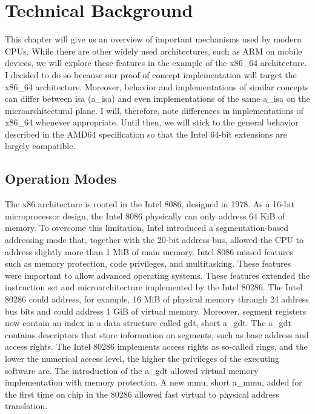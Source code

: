 \section{Technical Background}
\label{sec:state:technical}
This chapter will give us an overview of important mechanisms used by modern
CPUs. While there are other widely used architectures, such as ARM on mobile
devices, we will explore these features in the example of the x86\_64
architecture. \\

I decided to do so because our proof of concept implementation will target the
x86\_64 architecture. Moreover, behavior and implementations of similar concepts
can differ between \gls{isa} (\acrshort{a_isa}) and even implementations of the
same \acrshort{a_isa} on the microarchitectural plane. I will, therefore, note
differences in implementations of x86\_64 whenever appropriate. Until then, we
will stick to the general behavior described in the AMD64 specification so that
the Intel 64-bit extensions are largely compatible.

\subsection{Operation Modes}
\label{sec:state:technical:modes}
The x86 architecture is rooted in the Intel 8086, designed in 1978. As a 16-bit
microprocessor design, the Intel 8086 physically can only address 64 KiB of
memory. To overcome this limitation, Intel introduced a segmentation-based
addressing mode that, together with the 20-bit address bus, allowed the CPU to
address slightly more than 1 MiB of main memory. Intel 8086 missed features such
as memory protection, code privileges, and multitasking. These features were
important to allow advanced operating systems. These features extended the
instruction set and microarchitecture implemented by the Intel 80286. The Intel
80286 could address, for example, 16 MiB of physical memory through 24 address
bus bits and could address 1 GiB of virtual memory. Moreover, segment registers
now contain an index in a data structure called \gls{gdt}, short
\acrshort{a_gdt}. The \acrshort{a_gdt} contains descriptors that store
information on segments, such as base address and access rights. The Intel 80286
implements access rights as so-called rings, and the lower the numerical access
level, the higher the privileges of the executing software are. The introduction
of the \acrshort{a_gdt} allowed virtual memory implementation with memory
protection. A new \gls{mmu}, short \acrshort{a_mmu}, added for the first time on
chip in the 80286 allowed fast virtual to physical address translation. \\

